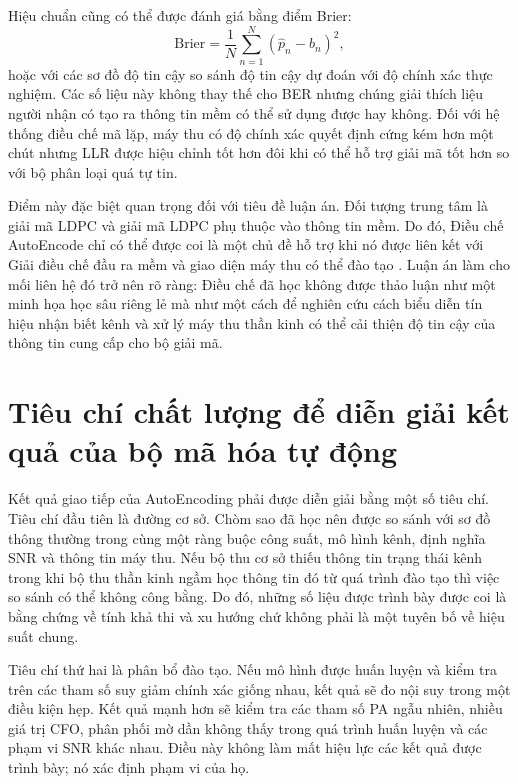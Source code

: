 Hiệu chuẩn cũng có thể được đánh giá bằng điểm Brier:
\begin{equation}
  \mathrm{Brier}=\frac{1}{N}\sum_{n=1}^{N}(\hat{p}_n-b_n)^2,
\end{equation}
hoặc với các sơ đồ độ tin cậy so sánh độ tin cậy dự đoán với độ chính xác thực nghiệm. Các số liệu này không thay thế cho BER nhưng chúng giải thích liệu người nhận có tạo ra thông tin mềm có thể sử dụng được hay không. Đối với hệ thống điều chế mã lặp, máy thu có độ chính xác quyết định cứng kém hơn một chút nhưng LLR được hiệu chỉnh tốt hơn đôi khi có thể hỗ trợ giải mã tốt hơn so với bộ phân loại quá tự tin.

Điểm này đặc biệt quan trọng đối với tiêu đề luận án. Đối tượng trung tâm là giải mã LDPC và giải mã LDPC phụ thuộc vào thông tin mềm. Do đó, Điều chế AutoEncode chỉ có thể được coi là một chủ đề hỗ trợ khi nó được liên kết với Giải điều chế đầu ra mềm và giao diện máy thu có thể đào tạo \cite{cammerer2020}. Luận án làm cho mối liên hệ đó trở nên rõ ràng: Điều chế đã học không được thảo luận như một minh họa học sâu riêng lẻ mà như một cách để nghiên cứu cách biểu diễn tín hiệu nhận biết kênh và xử lý máy thu thần kinh có thể cải thiện độ tin cậy của thông tin cung cấp cho bộ giải mã.

\section{Tiêu chí chất lượng để diễn giải kết quả của bộ mã hóa tự động}
Kết quả giao tiếp của AutoEncoding phải được diễn giải bằng một số tiêu chí. Tiêu chí đầu tiên là đường cơ sở. Chòm sao đã học nên được so sánh với sơ đồ thông thường trong cùng một ràng buộc công suất, mô hình kênh, định nghĩa SNR và thông tin máy thu. Nếu bộ thu cơ sở thiếu thông tin trạng thái kênh trong khi bộ thu thần kinh ngầm học thông tin đó từ quá trình đào tạo thì việc so sánh có thể không công bằng. Do đó, những số liệu được trình bày được coi là bằng chứng về tính khả thi và xu hướng chứ không phải là một tuyên bố về hiệu suất chung.

Tiêu chí thứ hai là phân bổ đào tạo. Nếu mô hình được huấn luyện và kiểm tra trên các tham số suy giảm chính xác giống nhau, kết quả sẽ đo nội suy trong một điều kiện hẹp. Kết quả mạnh hơn sẽ kiểm tra các tham số PA ngẫu nhiên, nhiều giá trị CFO, phân phối mờ dần không thấy trong quá trình huấn luyện và các phạm vi SNR khác nhau. Điều này không làm mất hiệu lực các kết quả được trình bày; nó xác định phạm vi của họ.

